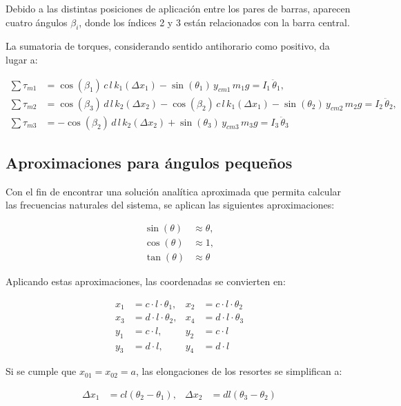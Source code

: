 Debido a las distintas posiciones de aplicación entre los pares de barras, aparecen cuatro ángulos \(\beta_i\), donde los índices 2 y 3 están relacionados con la barra central.

La sumatoria de torques, considerando sentido antihorario como positivo, da lugar a:

\begin{align*}
\sum \tau_{m1} &= \cos(\beta_1) \, c \, l \, k_1 (\Delta x_1) - \sin(\theta_1) \, y_{cm1} \, m_1 g = I_1 \, \ddot{\theta}_1, \\
\sum \tau_{m2} &= \cos(\beta_3) \, d \, l \, k_2 (\Delta x_2) - \cos(\beta_2) \, c \, l \, k_1 (\Delta x_1) - \sin(\theta_2) \, y_{cm2} \, m_2 g = I_2 \, \ddot{\theta}_2, \\
\sum \tau_{m3} &= -\cos(\beta_2) \, d \, l \, k_2 (\Delta x_2) + \sin(\theta_3) \, y_{cm3} \, m_3 g = I_3 \, \ddot{\theta}_3
\end{align*}

\subsection*{Aproximaciones para ángulos pequeños}

Con el fin de encontrar una solución analítica aproximada que permita calcular las frecuencias naturales del sistema, se aplican las siguientes aproximaciones:

\begin{align*}
    \sin(\theta) &\approx \theta, \\
    \cos(\theta) &\approx 1, \\
    \tan(\theta) &\approx \theta
\end{align*}

Aplicando estas aproximaciones, las coordenadas se convierten en:

\begin{align*}
x_1 &= c \cdot l \cdot \theta_1, & x_2 &= c \cdot l \cdot \theta_2 \\
x_3 &= d \cdot l \cdot \theta_2, & x_4 &= d \cdot l \cdot \theta_3 \\
y_1 &= c \cdot l, & y_2 &= c \cdot l \\
y_3 &= d \cdot l, & y_4 &= d \cdot l
\end{align*}

Si se cumple que \(x_{01} = x_{02} = a\), las elongaciones de los resortes se simplifican a:

\begin{align*}
\Delta x_1 &= cl(\theta_2 - \theta_1), & \Delta x_2 &= dl(\theta_3 - \theta_2)
\end{align*}

